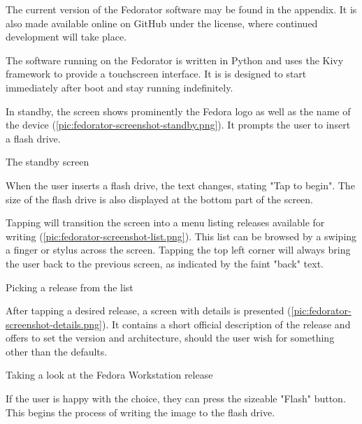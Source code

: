         The current version of the Fedorator software may be found in the appendix.  It is also made available online on GitHub under the  license\cite{fedorator-github}, where continued development will take place.  
        
        The software running on the Fedorator is written in Python and uses the Kivy framework to provide a touchscreen interface.  It is is designed to start immediately after boot and stay running indefinitely.
        
        In standby, the screen shows prominently the Fedora logo as well as the name of the device (\ref{pic:fedorator-screenshot-standby.png}).  It prompts the user to insert a flash drive.
        
            {The standby screen}
        
        When the user inserts a flash drive, the text changes, stating "Tap to begin".  The size of the flash drive is also displayed at the bottom part of the screen.
        
        Tapping will transition the screen into a menu listing releases available for writing (\ref{pic:fedorator-screenshot-list.png}).  This list can be browsed by a swiping a finger or stylus across the screen.  Tapping the top left corner will always bring the user back to the previous screen, as indicated by the faint "back" text. 
        
            {Picking a release from the list}
        
        After tapping a desired release, a screen with details is presented (\ref{pic:fedorator-screenshot-details.png}).  It contains a short official description of the release and offers to set the version and architecture, should the user wish for something other than the defaults.
        
            {Taking a look at the Fedora Workstation release}
        
        If the user is happy with the choice, they can press the sizeable "Flash" button.  This begins the process of writing the image to the flash drive.
        
        
        
